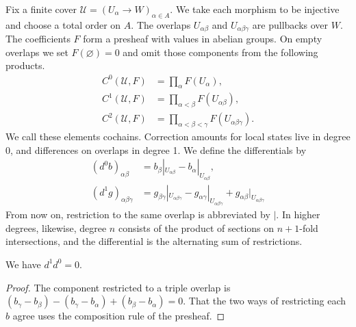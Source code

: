 \begin{definition}\label{def:2.16}

Fix a finite cover $\mathcal{U}=(U_\alpha\to W)_{\alpha\in A}$. We take each morphism to
be injective and choose a total order on $A$. The overlaps $U_{\alpha\beta}$ and
$U_{\alpha\beta\gamma}$ are pullbacks over $W$. The coefficients $F$ form a presheaf with
values in abelian groups. On empty overlaps we set $F(\varnothing)=0$ and omit those
components from the following products.
\begin{equation*}
\begin{aligned}
C^0(\mathcal{U},F)&=\prod_\alpha F(U_\alpha),\\
C^1(\mathcal{U},F)&=\prod_{\alpha<\beta}F(U_{\alpha\beta}),\\
C^2(\mathcal{U},F)&=\prod_{\alpha<\beta<\gamma}F(U_{\alpha\beta\gamma}).
\end{aligned}
\tag{2.10}\label{eq:2.10}
\end{equation*}
We call these elements cochains. Correction amounts for local states live in degree 0,
and differences on overlaps in degree 1. We define the differentials by
\begin{equation*}
\begin{aligned}
(d^0b)_{\alpha\beta}&=b_\beta|_{U_{\alpha\beta}}-b_\alpha|_{U_{\alpha\beta}},\\
(d^1g)_{\alpha\beta\gamma}&=g_{\beta\gamma}|_{U_{\alpha\beta\gamma}}
-g_{\alpha\gamma}|_{U_{\alpha\beta\gamma}}
+g_{\alpha\beta}|_{U_{\alpha\beta\gamma}}
\end{aligned}
\tag{2.11}\label{eq:2.11}
\end{equation*}
From now on, restriction to the same overlap is abbreviated by $|$. In higher degrees,
likewise, degree $n$ consists of the product of sections on $n+1$-fold intersections,
and the differential is the alternating sum of restrictions.

\end{definition}

\begin{lemma}\label{lem:2.17}

We have $d^1d^0=0$.

\end{lemma}

\begin{proof}

The component restricted to a triple overlap is
$(b_\gamma-b_\beta)-(b_\gamma-b_\alpha)+(b_\beta-b_\alpha)=0$. That the two ways of
restricting each $b$ agree uses the composition rule of the presheaf.

\end{proof}

